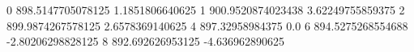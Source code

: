 0 898.5147705078125 1.1851806640625
1 900.9520874023438 3.62249755859375
2 899.9874267578125 2.6578369140625
4 897.32958984375 0.0
6 894.5275268554688 -2.80206298828125
8 892.692626953125 -4.636962890625
